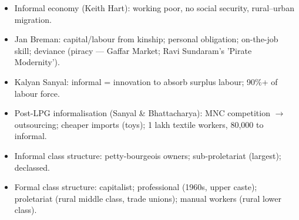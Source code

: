 \begin{QuickRevision}
\begin{itemize}
\item Informal economy (Keith Hart): working poor, no social security, rural--urban migration.
\item Jan Breman: capital/labour from kinship; personal obligation; on-the-job skill; deviance (piracy --- Gaffar Market; Ravi Sundaram's 'Pirate Modernity').
\item Kalyan Sanyal: informal = innovation to absorb surplus labour; 90\%+ of labour force.
\item Post-LPG informalisation (Sanyal \& Bhattacharya): MNC competition $\rightarrow$ outsourcing; cheaper imports (toys); 1 lakh textile workers, 80,000 to informal.
\item Informal class structure: petty-bourgeois owners; sub-proletariat (largest); declassed.
\item Formal class structure: capitalist; professional (1960s, upper caste); proletariat (rural middle class, trade unions); manual workers (rural lower class).
\end{itemize}
\end{QuickRevision}

